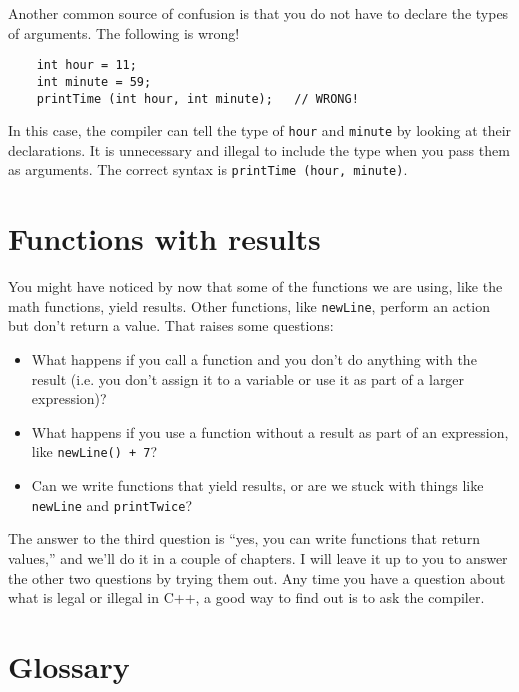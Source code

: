 Another common source of confusion is that you do not have
to declare the types of arguments.  The following is wrong!

\begin{lstlisting}
    int hour = 11;
    int minute = 59;
    printTime (int hour, int minute);   // WRONG!
\end{lstlisting}
%
In this case, the compiler can tell the type of {\tt hour}
and {\tt minute} by looking at their declarations.  It is
unnecessary and illegal to include the type when you pass them
as arguments.  The correct
syntax is {\tt printTime (hour, minute)}.

\section {Functions with results}

You might have noticed by now that some of the functions we are using,
like the math functions, yield results.  Other functions,
like {\tt newLine}, perform an action but
don't return a value.  That raises some questions:

\begin{itemize}

\item What happens if you call a function and you don't
do anything with the result (i.e. you don't assign it to
a variable or use it as part of a larger expression)?

\item What happens if you use a function without a result as part
of an expression, like {\tt newLine() + 7}?

\item Can we write functions that yield results, or are we
stuck with things like {\tt newLine} and {\tt printTwice}?

\end{itemize}

The answer to the third question is ``yes, you can write functions that
return values,'' and we'll do it in a couple of chapters.  I will
leave it up to you to answer the other two questions by trying them
out.  Any time you have a question about what is legal or
illegal in C++, a good way to find out is to ask the compiler.

\section{Glossary}

